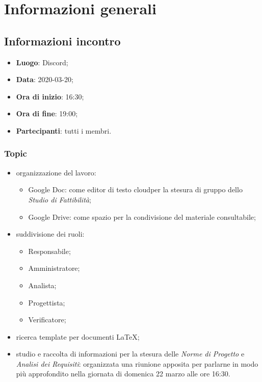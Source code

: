 \section{Informazioni generali}
\subsection{Informazioni incontro}
\begin{itemize}
\item \textbf{Luogo}: Discord\glo;
\item \textbf{Data}: 2020-03-20;
\item \textbf{Ora di inizio}: 16:30;
\item \textbf{Ora di fine}: 19:00;
\item \textbf{Partecipanti}: tutti i membri.
\end{itemize}

\subsubsection{Topic}
\begin{itemize}
\item organizzazione del lavoro:
\begin{itemize}
\item Google Doc: come editor di testo cloud\glo per la stesura di gruppo dello \textit{Studio di Fattibilità};
\item Google Drive: come spazio per la condivisione del materiale consultabile;
\end{itemize}
\item suddivisione dei ruoli: \begin{itemize}
\item Responsabile;
\item Amministratore;
\item Analista;
\item Progettista;
\item Verificatore;
\end{itemize}
\item ricerca template per documenti \LaTeX{};
\item studio e raccolta di informazioni per la stesura delle \textit{Norme di Progetto} e \textit{Analisi dei Requisiti}: organizzata una riunione apposita per parlarne in modo più approfondito nella giornata di domenica 22 marzo alle ore 16:30.
\end{itemize}